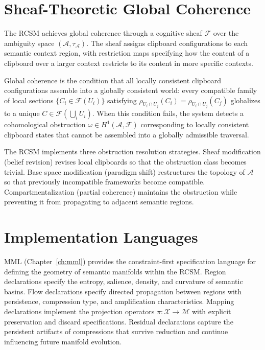 \documentclass[12pt,oneside]{book}
\theoremstyle{plain}
\theoremstyle{definition}
\theoremstyle{plain}
\newcommand{\cA}{\mathcal{A}}
\newcommand{\cM}{\mathcal{M}}
\newcommand{\cX}{\mathcal{X}}
\begin{document}
\section{Sheaf-Theoretic Global Coherence}

The RCSM achieves global coherence through a cognitive sheaf $\mathcal{F}$ over the ambiguity space $(\cA, \tau_\cA)$. The sheaf assigns clipboard configurations to each semantic context region, with restriction maps specifying how the content of a clipboard over a larger context restricts to its content in more specific contexts.

Global coherence is the condition that all locally consistent clipboard configurations assemble into a globally consistent world: every compatible family of local sections $\{C_i \in \mathcal{F}(U_i)\}$ satisfying $\rho_{U_i \cap U_j}(C_i) = \rho_{U_i \cap U_j}(C_j)$ globalizes to a unique $C \in \mathcal{F}(\bigcup_i U_i)$. When this condition fails, the system detects a cohomological obstruction $\omega \in H^1(\cA, \mathcal{F})$ corresponding to locally consistent clipboard states that cannot be assembled into a globally admissible traversal.

The RCSM implements three obstruction resolution strategies. Sheaf modification (belief revision) revises local clipboards so that the obstruction class becomes trivial. Base space modification (paradigm shift) restructures the topology of $\cA$ so that previously incompatible frameworks become compatible. Compartmentalization (partial coherence) maintains the obstruction while preventing it from propagating to adjacent semantic regions.

\section{Implementation Languages}

MML (Chapter~\ref{ch:mml}) provides the constraint-first specification language for defining the geometry of semantic manifolds within the RCSM. Region declarations specify the entropy, salience, density, and curvature of semantic basins. Flow declarations specify directed propagation between regions with persistence, compression type, and amplification characteristics. Mapping declarations implement the projection operators $\pi : \cX \to \cM$ with explicit preservation and discard specifications. Residual declarations capture the persistent artifacts of compressions that survive reduction and continue influencing future manifold evolution.
\end{document}
